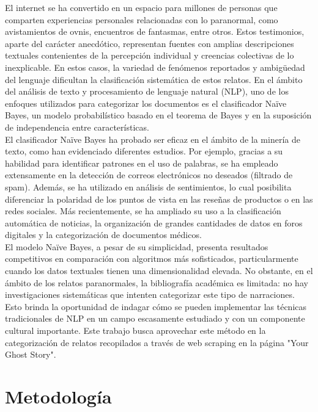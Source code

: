 \documentclass[12pt, letterpaper]{report}
\begin{document}
El internet se ha convertido en un espacio para millones de personas que comparten experiencias personales relacionadas con lo paranormal, como avistamientos de ovnis, encuentros de fantasmas, entre otros. Estos testimonios, aparte del carácter anecdótico, representan fuentes con amplias descripciones textuales contenientes de la percepción individual y creencias colectivas de lo inexplicable. En estos casos, la variedad de fenómenos reportados y ambigüedad del lenguaje dificultan la clasificación sistemática de estos relatos.
En el ámbito del análisis de texto y procesamiento de lenguaje natural (NLP), uno de los enfoques utilizados para categorizar los documentos es el clasificador Naïve Bayes, un modelo probabilístico basado en el teorema de Bayes y en la suposición de independencia entre características. \\
El clasificador Naïve Bayes ha probado ser eficaz en el ámbito de la minería de texto, como han evidenciado diferentes estudios. Por ejemplo, gracias a su habilidad para identificar patrones en el uso de palabras, se ha empleado extensamente en la detección de correos electrónicos no deseados (filtrado de spam). Además, se ha utilizado en análisis de sentimientos, lo cual posibilita diferenciar la polaridad de los puntos de vista en las reseñas de productos o en las redes sociales. Más recientemente, se ha ampliado su uso a la clasificación automática de noticias, la organización de grandes cantidades de datos en foros digitales y la categorización de documentos médicos. \\
El modelo Naïve Bayes, a pesar de su simplicidad, presenta resultados competitivos en comparación con algoritmos más sofisticados, particularmente cuando los datos textuales tienen una dimensionalidad elevada. No obstante, en el ámbito de los relatos paranormales, la bibliografía académica es limitada: no hay investigaciones sistemáticas que intenten categorizar este tipo de narraciones. Esto brinda la oportunidad de indagar cómo se pueden implementar las técnicas tradicionales de NLP en un campo escasamente estudiado y con un componente cultural importante.
Este trabajo busca aprovechar este método en la categorización de relatos recopilados a través de web scraping  en la página "Your Ghost Story". \\

\section*{Metodología}
\end{document}
